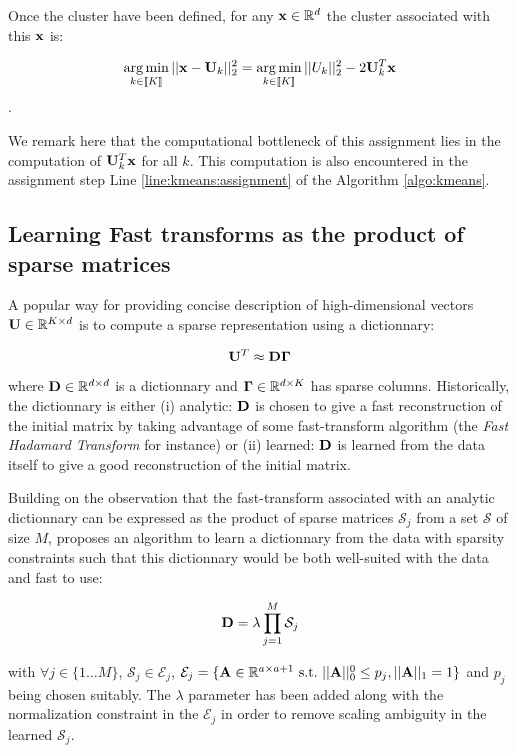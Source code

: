 Once the cluster have been defined, for any ${\mathbf{x}} \in \mathbb{R}^d$ the cluster associated with this ${\mathbf{x}}$ is:

\begin{equation}
\label{eq:assignment_problem_kmeans}
\operatorname*{arg\,min}_{k \in [\![K]\!]} ||{\mathbf{x}} - {\mathbf{U}}_{k}||_2^2 = \operatorname*{arg\,min}_{k \in [\![K]\!]} ||U_k||_2^2 - 2 {\mathbf{U}}_{k}^T{\mathbf{x}}
\end{equation}.


We remark here that the computational bottleneck of this assignment lies in the computation of ${\mathbf{U}}_k^T{\mathbf{x}}$ for all $k$. This computation is also encountered in the assignment step Line \ref{line:kmeans:assignment} of the Algorithm \ref{algo:kmeans}.


\subsection{Learning Fast transforms as the product of sparse matrices}
\label{sec:palm4led}
A popular way for providing concise description of high-dimensional vectors ${\mathbf{U}} \in \mathbb{R}^{K \times d}$ is to compute a sparse representation using a dictionnary:

\begin{equation}
{\mathbf{U}}^T \approx {\mathbf{D}}{\mathbf{\Gamma}}
\end{equation}

where ${\mathbf{D}} \in \mathbb{R}^{d \times d}$ is a dictionnary and ${\mathbf{\Gamma}} \in \mathbb{R}^{d \times K}$ has sparse columns. Historically, the dictionnary is either (i) analytic: ${\mathbf{D}}$ is chosen to give a fast reconstruction of the initial matrix by taking advantage of some fast-transform algorithm (the \textit{Fast Hadamard Transform} for instance) or (ii) learned: ${\mathbf{D}}$ is learned from the data itself to give a good reconstruction of the initial matrix.

Building on the observation that the fast-transform associated with an analytic dictionnary can be expressed as the product of sparse matrices $\mathcal{S}_j$ from a set $\mathcal{S}$ of size $M$, \cite{magoarou2014learning} proposes an algorithm to learn a dictionnary from the data with sparsity constraints such that this dictionnary would be both well-suited with the data and fast to use:

\begin{equation}
{\mathbf{D}} = \lambda \prod_{j=1}^{M}\mathcal{S}_j
\end{equation}

with $\forall j \in \{1 \ldots M\}$, $\mathcal{S}_j \in \mathcal{E}_j$, $\mathcal{E}_j = \lbrace {\mathbf{A}} \in \mathbb{R}^{a \times a+1}~\text{s.t.}~||{\mathbf{A}}||_0^0 \leq p_j, ||{\mathbf{A}}||_1 = 1 \rbrace$ and $p_j$ being chosen suitably. The $\lambda$ parameter has been added along with the normalization constraint in the $\mathcal{E}_j$ in order to remove scaling ambiguity in the learned $\mathcal{S}_j$.

